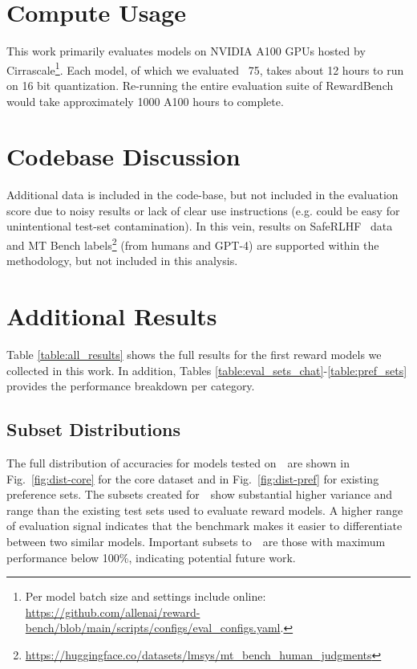 \newpage
\begin{appendices}

\startcontents[sections]

\newpage



\section{Compute Usage}
\label{sec:compute}
This work primarily evaluates models on NVIDIA A100 GPUs hosted by Cirrascale\footnote{Per model batch size and settings include online: \url{https://github.com/allenai/reward-bench/blob/main/scripts/configs/eval_configs.yaml}.}.
Each model, of which we evaluated ~75, takes about 12 hours to run on 16 bit quantization.
Re-running the entire evaluation suite of RewardBench would take approximately 1000 A100 hours to complete.

\section{Codebase Discussion}
Additional data is included in the code-base, but not included in the evaluation score due to noisy results or lack of clear use instructions (e.g. could be easy for unintentional test-set contamination). 
In this vein, results on SafeRLHF~\citep{dai2023safe} data and MT Bench labels\footnote{\url{https://huggingface.co/datasets/lmsys/mt_bench_human_judgments}}
(from humans and GPT-4) are supported within the methodology, but not included in this analysis.


\section{Additional Results}
\label{appdx:results}

Table \ref{table:all_results} shows the full results for the first reward models we collected in this work. 
In addition, Tables \ref{table:eval_sets_chat}-\ref{table:pref_sets} provides the performance breakdown per category.





\subsection{Subset Distributions}
\label{appdx:results_dist_subset}
The full distribution of accuracies for models tested on~\name~are shown in Fig.~\ref{fig:dist-core} for the core dataset and in Fig.~\ref{fig:dist-pref} for existing preference sets.
The subsets created for~\name~show substantial higher variance and range than the existing test sets used to evaluate reward models.
A higher range of evaluation signal indicates that the benchmark makes it easier to differentiate between two similar models.
Important subsets to~\name~are those with maximum performance below 100\%, indicating potential future work.


\end{appendices}
